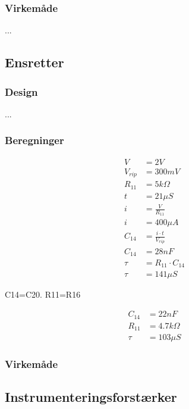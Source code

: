 \subsubsection{Virkemåde}
...

\subsection{Ensretter}

\subsubsection{Design}
...
\subsubsection{Beregninger}

\begin{equation}
\label{eq:EnsretterKondensator}
\begin{split}
V & = 2V \\
V_{rip} & = 300mV \\
R_{11} & = 5k \Omega \\
t & = 21 \mu S \\
i & = \frac{V}{R_{11}} \\
i & = 400 \mu A \\
C_{14} & = \frac{i \cdot t}{V_{rip} }\\
C_{14} & = 28nF \\
\tau & = R_{11} \cdot C_{14} \\
\tau & = 141 \mu S
\end{split}
\end{equation}

C14=C20. R11=R16

\begin{equation}
\label{eq:EnsretterKondensatorTilnaermelse}
\begin{split}
C_{14} & = 22nF \\
R_{11} & = 4.7k \Omega \\
\tau & = 103 \mu S
\end{split}
\end{equation}

\subsubsection{Virkemåde}

\subsection{Instrumenteringsforstærker}

